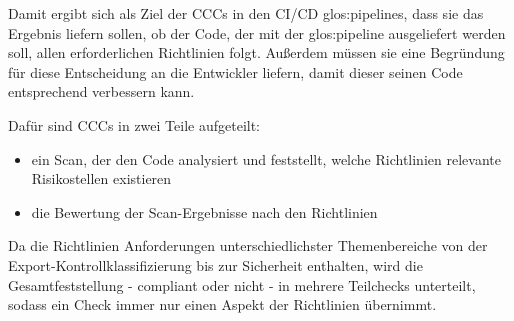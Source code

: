 \documentclass[../main.tex]{subfiles}
\begin{document}
Damit ergibt sich als Ziel der \glspl{CCC} in den \gls{CI/CD} \glspl{glos:pipeline}, dass sie das Ergebnis liefern sollen, ob der Code, der mit der \gls{glos:pipeline} ausgeliefert werden soll, allen erforderlichen Richtlinien folgt.
Außerdem müssen sie eine Begründung für diese Entscheidung an die Entwickler liefern, damit dieser seinen Code entsprechend verbessern kann.

Dafür sind \glspl{CCC} in zwei Teile aufgeteilt:
\begin{itemize}
    \item ein Scan, der den Code analysiert und feststellt, welche Richtlinien relevante Risikostellen existieren 
    \item die Bewertung der Scan-Ergebnisse nach den Richtlinien
  \end{itemize}

Da die Richtlinien Anforderungen unterschiedlichster Themenbereiche von der Export-Kontrollklassifizierung bis zur Sicherheit enthalten, wird die Gesamtfeststellung - compliant oder nicht - in mehrere Teilchecks unterteilt, sodass ein Check immer nur einen Aspekt der Richtlinien übernimmt. 
\end{document}
